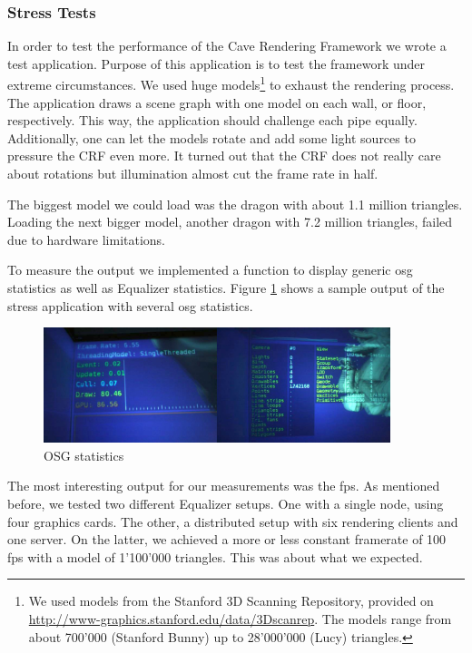 \subsubsection{Stress Tests}
In order to test the performance of the Cave Rendering Framework we wrote a test application. Purpose of this application is to test the framework under extreme circumstances. We used huge models\footnote{We used models from the Stanford 3D Scanning Repository, provided on \href{http://www-graphics.stanford.edu/data/3Dscanrep}{http://www-graphics.stanford.edu/data/3Dscanrep}. The models range from about 700'000 (Stanford Bunny) up to 28'000'000 (Lucy) triangles.} to exhaust the rendering process. The application draws a scene graph with one model on each wall, or floor, respectively. This way, the application should challenge each pipe equally. Additionally, one can let the models rotate and add some light sources to pressure the CRF even more. It turned out that the CRF does not really care about rotations but illumination almost cut the frame rate in half.

The biggest model we could load was the dragon with about 1.1 million triangles. Loading the next bigger model, another dragon with 7.2 million triangles, failed due to hardware limitations. 

To measure the output we implemented a function to display generic \gls{osg} statistics as well as Equalizer statistics. Figure \ref{fig:osg_stats} shows a sample output of the stress application with several \gls{osg} statistics.

\begin{figure}[H]
	\centering
	\includegraphics[width=0.9\textwidth]{../figures/fotos/osgStats}
	\caption{OSG statistics}
	\label{fig:osg_stats}
\end{figure}

The most interesting output for our measurements was the \gls{fps}. As mentioned before, we tested two different Equalizer setups. One with a single node, using four graphics cards. The other, a distributed setup with six rendering clients and one server. On the latter, we achieved a more or less constant framerate of 100 \gls{fps} with a model of 1'100'000 triangles. This was about what we expected.

